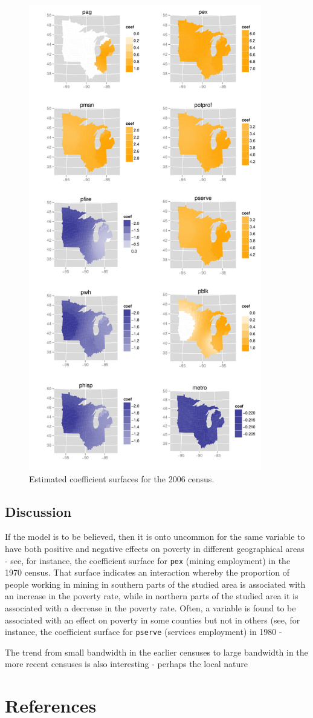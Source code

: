 \documentclass[authoryear, review, 11pt]{elsarticle}
\begin{document}
	\begin{figure}
		\begin{center}
			\includegraphics[height=8in]{../../figures/poverty/2006.linear.coefficients.pdf}
			\caption{Estimated coefficient surfaces for the 2006 census.\label{fig:census-coefs-2006}}
		\end{center}
	\end{figure}
			
	\subsection{Discussion}
	If the model is to be believed, then it is onto uncommon for the same variable to have both positive and negative effects on poverty in different geographical areas - see, for instance, the coefficient surface for \verb!pex! (mining employment) in the 1970 census. That surface indicates an interaction whereby the proportion of people working in mining in southern parts of the studied area is associated with an increase in the poverty rate, while in northern parts of the studied area it is associated with a decrease in the poverty rate. Often, a variable is found to be associated with an effect on poverty in some counties but not in others (see, for instance, the coefficient surface for \verb!pserve! (services employment) in 1980 - 
	
	The trend from small bandwidth in the earlier censuses to large bandwidth in the more recent censuses is also interesting - perhaps the local nature 


\section{References}


\end{document}
